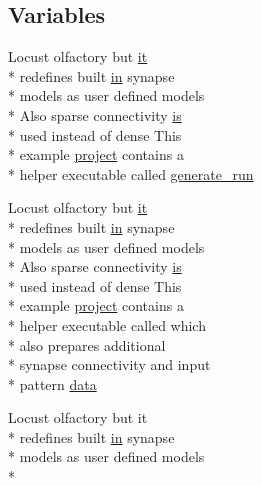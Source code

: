 \subsection*{Variables}
\begin{DoxyCompactItemize}
\item 
Locust olfactory but \hyperlink{userproject_2PoissonIzh__project_2README_8txt_a3e3bbb6c9b14c38757cf273a117e43e8}{it} \\*
redefines built \hyperlink{README_8txt_a148897a6b2cc9cff25af80abb13426b0}{in} synapse \\*
models as user defined models \\*
Also sparse connectivity \hyperlink{userproject_2MBody__userdef__project_2README_8txt_a7b4e6cf78d14ce882cb8ff127e01babd}{is} \\*
used instead of dense This \\*
example \hyperlink{userproject_2SynDelay__project_2README_8txt_a762c750134e07a31b7965860fd292b51}{project} contains a \\*
helper executable called \hyperlink{userproject_2MBody__userdef__project_2README_8txt_a320a215d1e27b4de394be70e90d22863}{generate\+\_\+run}
\item 
Locust olfactory but \hyperlink{userproject_2PoissonIzh__project_2README_8txt_a3e3bbb6c9b14c38757cf273a117e43e8}{it} \\*
redefines built \hyperlink{README_8txt_a148897a6b2cc9cff25af80abb13426b0}{in} synapse \\*
models as user defined models \\*
Also sparse connectivity \hyperlink{userproject_2MBody__userdef__project_2README_8txt_a7b4e6cf78d14ce882cb8ff127e01babd}{is} \\*
used instead of dense This \\*
example \hyperlink{userproject_2SynDelay__project_2README_8txt_a762c750134e07a31b7965860fd292b51}{project} contains a \\*
helper executable called which \\*
also prepares additional \\*
synapse connectivity and input \\*
pattern \hyperlink{userproject_2MBody__userdef__project_2README_8txt_a2c8f0ac6d2a5af52eff55cd5d4c5cca4}{data}
\item 
Locust olfactory but it \\*
redefines built \hyperlink{README_8txt_a148897a6b2cc9cff25af80abb13426b0}{in} synapse \\*
models as user defined models \\*

\end{DoxyCompactItemize}
